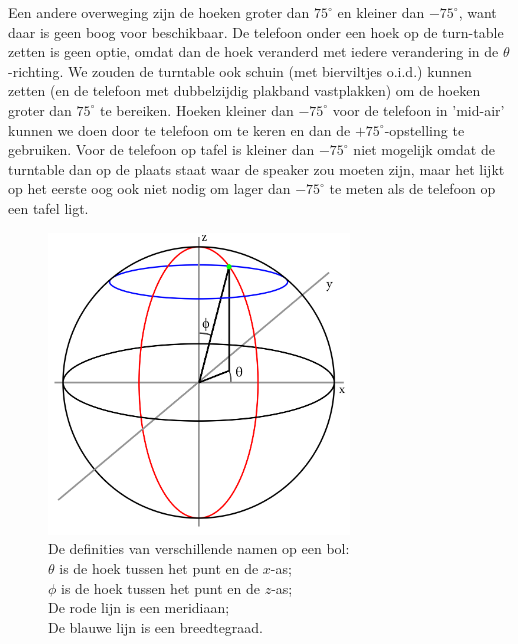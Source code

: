 Een andere overweging zijn de hoeken groter dan $75^\circ$ en kleiner dan $-75^\circ$, want daar is geen boog voor beschikbaar.
De telefoon onder een hoek op de turn-table zetten is geen optie, omdat dan de hoek veranderd met iedere verandering in de $\theta$-richting.
We zouden de turntable ook schuin (met bierviltjes o.i.d.) kunnen zetten (en de telefoon met dubbelzijdig plakband vastplakken) om de hoeken groter dan $75^\circ$ te bereiken. Hoeken kleiner dan $-75^\circ$ voor de telefoon in 'mid-air' kunnen we doen door te telefoon om te keren en dan de $+75^\circ$-opstelling te gebruiken.
Voor de telefoon op tafel is kleiner dan $-75^\circ$ niet mogelijk omdat de turntable dan op de plaats staat waar de speaker zou moeten zijn, maar het lijkt op het eerste oog ook niet nodig om lager dan $-75^\circ$ te meten als de telefoon op een tafel ligt.

\begin{figure}[h]
    \centering
    \includegraphics[width=8cm]{afbeeldingen/bol_definitie.png}
    \caption{De definities van verschillende namen op een bol:\\
    $\theta$ is de hoek tussen het punt en de $x$-as;\\
    $\phi$ is de hoek tussen het punt en de $z$-as;\\
    De rode lijn is een meridiaan;\\
    De blauwe lijn is een breedtegraad.}
    \label{fig:bol_def}
\end{figure}

